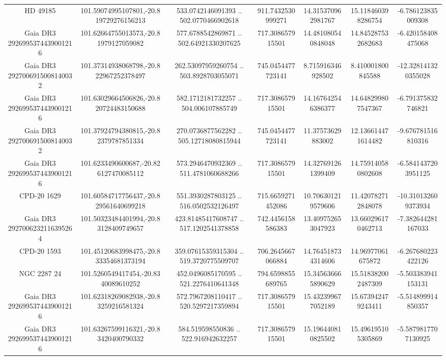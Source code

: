 \begin{table}
\begin{tabular}{ccccccc}
HD  49185 & 101.59074995107801,-20.819729276156213 & 533.0742146091393 .. 502.0770466902618 & 911.7432530999271 & 14.315370962981767 & 15.118460398286754 & -6.786123835009308 \\
Gaia DR3 2926995374439001216 & 101.62664755013573,-20.81979127059082 & 577.6788542869871 .. 502.64921330207625 & 717.308657915501 & 14.481080540848048 & 14.845287532682683 & -6.420158408475068 \\
Gaia DR3 2927006915008140032 & 101.37314938068798,-20.822967252378497 & 262.53097959260754 .. 503.8928703055071 & 745.0454477723141 & 8.715916346928502 & 8.410001800845588 & -12.328141320355028 \\
Gaia DR3 2926995374439001216 & 101.63029664506826,-20.820724483150688 & 582.1712181732257 .. 504.006107885749 & 717.308657915501 & 14.167642546386377 & 14.648299807547367 & -6.791375832746821 \\
Gaia DR3 2927006915008140032 & 101.37924794380815,-20.82379787851334 & 270.0736877562282 .. 505.12718080815944 & 745.0454477723141 & 11.37573629883002 & 12.136614471614482 & -9.676781516810316 \\
Gaia DR3 2926995374439001216 & 101.6233490600687,-20.826127470085112 & 573.2946470932369 .. 511.4781060688266 & 717.308657915501 & 14.327691261399409 & 14.759140580802608 & -6.5841437203951125 \\
CPD-20  1629 & 101.60584717756437,-20.829561640699218 & 551.3930287803125 .. 516.0502532126497 & 715.6659271452086 & 10.706301219579606 & 11.420782712848078 & -10.310132609373934 \\
Gaia DR3 2927006232116395264 & 101.50323484401994,-20.83128409749657 & 423.81485417608747 .. 517.1202541378858 & 742.4456158586383 & 13.409752653047923 & 13.660296170462713 & -7.382644281167033 \\
CPD-20  1593 & 101.45120683998475,-20.833354681373194 & 359.07615359315304 .. 519.3720775509707 & 706.2645667066884 & 14.764518734314606 & 14.96977061675872 & -6.267680223422126 \\
NGC  2287    24 & 101.5260549417454,-20.8340089610252 & 452.0496085170595 .. 521.2276410641348 & 794.6598855689765 & 15.345636665890629 & 15.518382002487309 & -5.503383941153131 \\
Gaia DR3 2926995374439001216 & 101.62318269082938,-20.83259216581324 & 572.7967208110417 .. 520.5297217359894 & 717.308657915501 & 15.432399677052189 & 15.673942479243411 & -5.514899914850357 \\
Gaia DR3 2926995374439001216 & 101.63267599116321,-20.83420400790332 & 584.519598550836 .. 522.916942632257 & 717.308657915501 & 15.196440810825502 & 15.496195105305869 & -5.5879817707130925 \\

\end{tabular}
\end{table}
